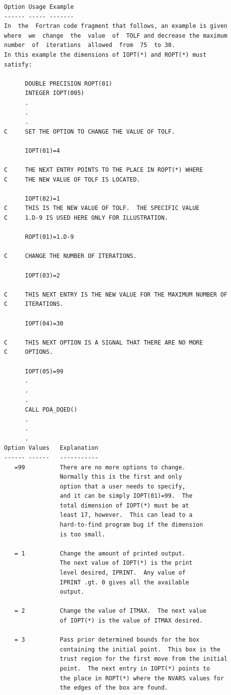 \documentclass[11pt,twoside]{article}
\begin{document}
\begin{verbatim}
  Option Usage Example
  ------ ----- -------
  In  the  Fortran code fragment that follows, an example is given
  where  we  change  the  value  of  TOLF and decrease the maximum
  number  of  iterations  allowed  from  75  to 30.
  In this example the dimensions of IOPT(*) and ROPT(*) must
  satisfy:

        DOUBLE PRECISION ROPT(01)
        INTEGER IOPT(005)
        .
        .
        .
  C     SET THE OPTION TO CHANGE THE VALUE OF TOLF.

        IOPT(01)=4

  C     THE NEXT ENTRY POINTS TO THE PLACE IN ROPT(*) WHERE
  C     THE NEW VALUE OF TOLF IS LOCATED.

        IOPT(02)=1
  C     THIS IS THE NEW VALUE OF TOLF.  THE SPECIFIC VALUE
  C     1.D-9 IS USED HERE ONLY FOR ILLUSTRATION.

        ROPT(01)=1.D-9

  C     CHANGE THE NUMBER OF ITERATIONS.

        IOPT(03)=2

  C     THIS NEXT ENTRY IS THE NEW VALUE FOR THE MAXIMUM NUMBER OF
  C     ITERATIONS.

        IOPT(04)=30

  C     THIS NEXT OPTION IS A SIGNAL THAT THERE ARE NO MORE
  C     OPTIONS.

        IOPT(05)=99
        .
        .
        .
        CALL PDA_DQED()
        .
        .
        .
  Option Values   Explanation
  ------ ------   -----------
     =99          There are no more options to change.
                  Normally this is the first and only
                  option that a user needs to specify,
                  and it can be simply IOPT(01)=99.  The
                  total dimension of IOPT(*) must be at
                  least 17, however.  This can lead to a
                  hard-to-find program bug if the dimension
                  is too small.

     = 1          Change the amount of printed output.
                  The next value of IOPT(*) is the print
                  level desired, IPRINT.  Any value of
                  IPRINT .gt. 0 gives all the available
                  output.

     = 2          Change the value of ITMAX.  The next value
                  of IOPT(*) is the value of ITMAX desired.

     = 3          Pass prior determined bounds for the box
                  containing the initial point.  This box is the
                  trust region for the first move from the initial
                  point.  The next entry in IOPT(*) points to
                  the place in ROPT(*) where the NVARS values for
                  the edges of the box are found.


\end{verbatim}
\end{document}
